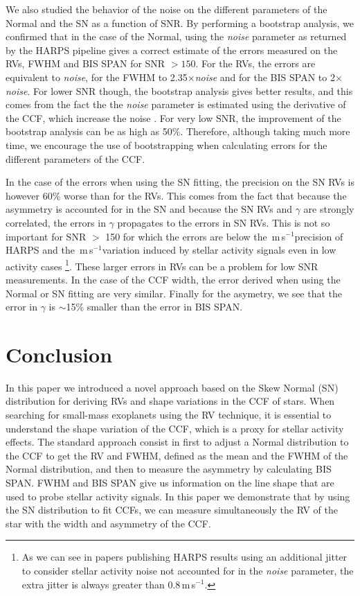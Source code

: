 \documentclass[11pt, oneside]{article}
\def\ms{\hbox{\,m\,s$^{-1}$}}         %
\begin{document}
We also studied the behavior of the noise on the different parameters of the Normal and the SN as a function of SNR. By performing a bootstrap analysis, we confirmed that in the case of the Normal, using the \emph{noise} parameter as returned by the HARPS pipeline gives a correct estimate of the errors measured on the RVs, FWHM and BIS SPAN for SNR $>150$. For the RVs, the errors are equivalent to \emph{noise}, for the FWHM to 2.35$\times$\emph{noise} and for the BIS SPAN to 2$\times$\emph{noise}. For lower SNR though, the bootstrap analysis gives better results, and this comes from the fact the the \emph{noise} parameter is estimated using the derivative of the CCF, which increase the noise \citep[][]{Bouchy-2001b}. For very low SNR, the improvement of the bootstrap analysis can be as high as 50\%. Therefore, although taking much more time, we encourage the use of bootstrapping when calculating errors for the different parameters of the CCF.

In the case of the errors when using the SN fitting, the precision on the SN RVs is however 60\% worse than for the RVs. This comes from the fact that because the asymmetry is accounted for in the SN and because the SN RVs and $\gamma$ are strongly correlated, the errors in $\gamma$ propagates to the errors in SN RVs. This is not so important for SNR $>$ 150 for which the errors are below the \ms precision of HARPS and the \ms variation induced by stellar activity signals even in low activity cases \footnote{As we can see in papers publishing HARPS results using an additional jitter to consider stellar activity noise not accounted for in the \emph{noise} parameter, the extra jitter is always greater than 0.8\ms \citep[e.g.][]{Diaz:2016ab}.}. These larger errors in RVs can be a problem for low SNR measurements. In the case of the CCF width, the error derived when using the Normal or SN fitting are very similar. Finally for the asymetry, we see that the error in $\gamma$ is $\sim$15\% smaller than the error in BIS SPAN.


\section{Conclusion} \label{sec:conclu}

In this paper we introduced a novel approach based on the Skew Normal (SN) distribution for deriving RVs and shape variations in the CCF of stars. When searching for small-mass exoplanets using the RV technique, it is essential to understand the shape variation of the CCF, which is a proxy for stellar activity effects. The standard approach consist in first to adjust a Normal distribution to the CCF to get the RV and FWHM, defined as the mean and the FWHM of the Normal distribution, and then to measure the asymmetry by calculating BIS SPAN. FWHM and BIS SPAN give us information on the line shape that are used to probe stellar activity signals. In this paper we demonstrate that by using the SN distribution to fit CCFs, we can measure simultaneously the RV of the star with the width and asymmetry of the CCF.
\end{document}
